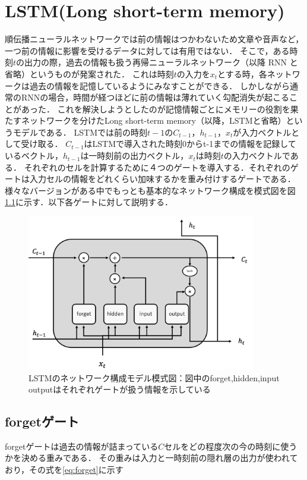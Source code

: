 \documentclass[a4j,11pt,report]{jsbook}
\begin{document}
\chapter{LSTM(Long short-term memory)\label{ch:LSTM}}
順伝播ニューラルネットワークでは前の情報はつかわないため文章や音声など，一つ前の情報に影響を受けるデータに対しては有用ではない．
そこで，ある時刻$t$の出力の際，過去の情報も扱う再帰ニューラルネットワーク（以降 RNN と省略）というものが発案された．
これは時刻$t$の入力を$x_{t}$とする時，各ネットワークは過去の情報を記憶しているようにみなすことができる．
しかしながら通常のRNNの場合，時間が経つほどに前の情報は薄れていく勾配消失が起こることがあった．
これを解決しようとしたのが記憶情報ごとにメモリーの役割を果たすネットワークを分けたLong short-term memory（以降，LSTMと省略）というモデルである．
LSTMでは前の時刻$t-1$の$C_{t-1}$，$h_{t-1}$，$x_{t}$が入力ベクトルとして受け取る．
$C_{t-1}$はLSTMで導入された時刻0からt-1までの情報を記録しているベクトル，$h_{t-1}$は一時刻前の出力ベクトル，$x_{t}$は時刻$t$の入力ベクトルである．
それぞれのセルを計算するために４つのゲートを導入する．それぞれのゲートは入力セルの情報をどれくらい加味するかを重み付けするゲートである．
様々なバージョンがある中でもっとも基本的なネットワーク構成を模式図を図\ref{fig:LSTM_Simple}に示す．以下各ゲートに対して説明する．


\begin{figure}
  \centering
  \includegraphics[width = 100mm]{image/lstm_simple_image.png}
  \caption{LSTMのネットワーク構成モデル模式図：図中のforget,hidden,input outputはそれぞれゲートが扱う情報を示している }
  \label{fig:LSTM_Simple}
\end{figure}

\section{forgetゲート\label{sec:forget}}
forgetゲートは過去の情報が詰まっている$C$セルをどの程度次の今の時刻に使うかを決める重みである．
その重みは入力と一時刻前の隠れ層の出力が使われており，その式を\ref{eq:forget}に示す
\end{document}
